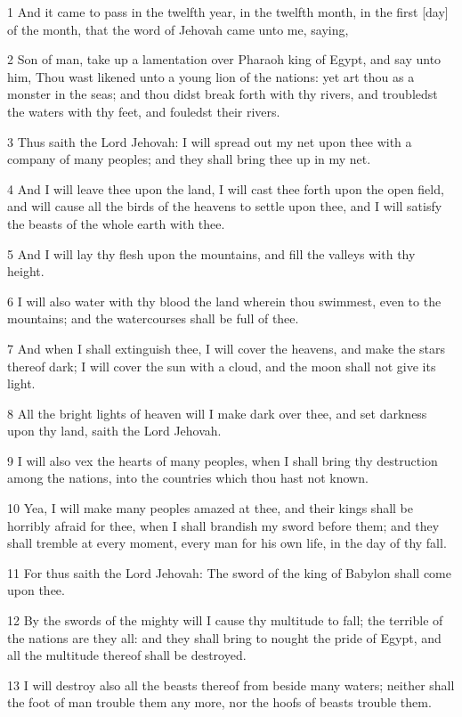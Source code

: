 \par 1 And it came to pass in the twelfth year, in the twelfth month, in the first [day] of the month, that the word of Jehovah came unto me, saying,
\par 2 Son of man, take up a lamentation over Pharaoh king of Egypt, and say unto him, Thou wast likened unto a young lion of the nations: yet art thou as a monster in the seas; and thou didst break forth with thy rivers, and troubledst the waters with thy feet, and fouledst their rivers.
\par 3 Thus saith the Lord Jehovah: I will spread out my net upon thee with a company of many peoples; and they shall bring thee up in my net.
\par 4 And I will leave thee upon the land, I will cast thee forth upon the open field, and will cause all the birds of the heavens to settle upon thee, and I will satisfy the beasts of the whole earth with thee.
\par 5 And I will lay thy flesh upon the mountains, and fill the valleys with thy height.
\par 6 I will also water with thy blood the land wherein thou swimmest, even to the mountains; and the watercourses shall be full of thee.
\par 7 And when I shall extinguish thee, I will cover the heavens, and make the stars thereof dark; I will cover the sun with a cloud, and the moon shall not give its light.
\par 8 All the bright lights of heaven will I make dark over thee, and set darkness upon thy land, saith the Lord Jehovah.
\par 9 I will also vex the hearts of many peoples, when I shall bring thy destruction among the nations, into the countries which thou hast not known.
\par 10 Yea, I will make many peoples amazed at thee, and their kings shall be horribly afraid for thee, when I shall brandish my sword before them; and they shall tremble at every moment, every man for his own life, in the day of thy fall.
\par 11 For thus saith the Lord Jehovah: The sword of the king of Babylon shall come upon thee.
\par 12 By the swords of the mighty will I cause thy multitude to fall; the terrible of the nations are they all: and they shall bring to nought the pride of Egypt, and all the multitude thereof shall be destroyed.
\par 13 I will destroy also all the beasts thereof from beside many waters; neither shall the foot of man trouble them any more, nor the hoofs of beasts trouble them.
